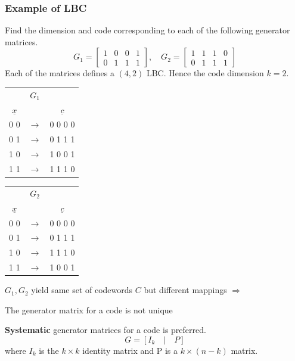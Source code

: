 \documentclass[12pt]{article}
\begin{document}
\subsubsection{Example of LBC}
Find the dimension and code corresponding to each of the following generator matrices.
\[
G_1=
\begin{bmatrix}
1&0&0&1\\
0&1&1&1
\end{bmatrix},
\quad
G_2 = 
\begin{bmatrix}
1&1&1&0\\
0&1&1&1
\end{bmatrix}
\]
Each of the matrices defines a $(4,2)$ LBC. Hence the code dimension $k=2$. 
\begin{multicols}{2}

\begin{table}[H]
    \centering
    \begin{tabular}{ccc}
        &$G_1$&\\
        $\underline{x}$ & & $\underline{c}$\\
        0 0 & $\longrightarrow$ & 0 0 0 0 \\
        0 1 & $\longrightarrow$ & 0 1 1 1 \\
        1 0 & $\longrightarrow$ & 1 0 0 1 \\
        1 1 & $\longrightarrow$ & 1 1 1 0 \\
    \end{tabular}
\end{table}
\columnbreak

\begin{table}[H]
    \centering
    \begin{tabular}{ccc}
            &$G_2$&\\
        $\underline{x}$ & & $\underline{c}$\\
        0 0 & $\longrightarrow$ & 0 0 0 0 \\
        0 1 & $\longrightarrow$ & 0 1 1 1 \\
        1 0 & $\longrightarrow$ & 1 1 1 0 \\
        1 1 & $\longrightarrow$ & 1 0 0 1 \\
    \end{tabular}
\end{table}
\end{multicols}
$G_1,G_2$ yield same set of codewords $C$ but different mappings $\Rightarrow$
\begin{center}
    The generator matrix for a code is not unique
\end{center}
\textbf{Systematic} generator matrices for a code is preferred.
{\large
\[
G = \left[ I_k \quad | \quad P\right]
\]}
where $I_k$ is the $k\times k$ identity matrix and P is a $k\times (n-k)$ matrix.
\end{document}
